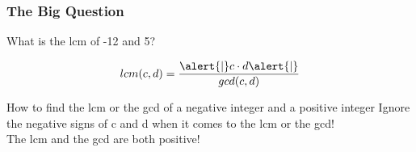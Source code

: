 \documentclass[
	11pt, %
	handout,
]{beamer}
\begin{document}
\begin{frame}
	\frametitle{The Big Question}
	\bigskip
	{\LARGE What is the lcm of -12 and 5?  }
	\bigskip
	\pause

	\begin{equation*}
		lcm(c, d) = \frac{\alert{\mid} c \cdot d \alert{\mid}}{gcd(c, d)}
	\end{equation*}

	\begin{alertblock}{How to find the lcm or the gcd of a negative integer and a positive integer}
	    Ignore the negative signs of c and d when it comes to the lcm or the gcd! \\ The lcm and the gcd are both positive!
	\end{alertblock}

\end{frame}
\end{document}
